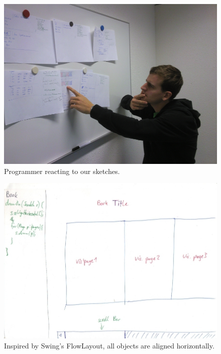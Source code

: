 \documentclass[english]{scrartcl}
\begin{document}
\begin{figure}[h]
	\includegraphics[width=\linewidth]{img/design-sketches_thinker.jpg}
	\caption[Confronting people with design sketches]{Programmer reacting to our sketches.}
\end{figure}

\begin{figure}[h]
	\includegraphics[width=\linewidth]{img/sketches/032.jpg}
	\caption[Bad sketch example: Horizontal and vertical alignment]{Inspired by Swing's FlowLayout, all objects are aligned horizontally.}
\end{figure}
\end{document}
